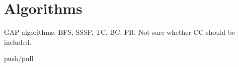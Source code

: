 \section{Algorithms}
\label{sec:algorithms}

GAP algorithms: BFS, SSSP, TC, BC, PR. Not sure whether CC should be included.

push/pull~\cite{DBLP:conf/icpp/YangBO18}

